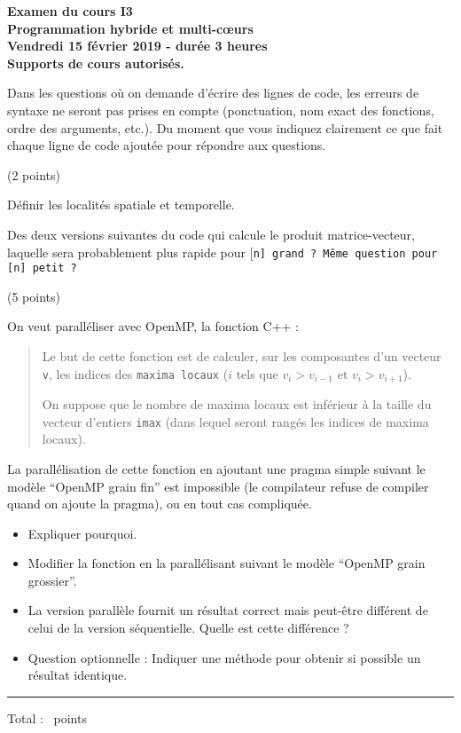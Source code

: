 \documentclass[12pt]{report}
\newcounter{cptPoints}
\newcounter{cptQuestions}
\newcommand\question[2]{\bigskip\par\addtocounter{cptQuestions}{1}\addtocounter{cptPoints}{#2}{\bf Question #1 n\textsuperscript{o} \thecptQuestions} (#2 points)\par}
\begin{document}
	\begin{center}\Large\bf
			Examen du cours I3\\
			Programmation hybride et multi-c\oe urs\\[0.4cm]
			Vendredi 15 f\'evrier 2019 - dur\'ee 3 heures\\
			Supports de cours autoris\'es.
		\end{center}
	\bigskip
	Dans les questions o\`u on demande d'\'ecrire des lignes de code, les erreurs de syntaxe ne seront pas prises en compte (ponctuation, nom exact des fonctions, ordre des arguments, etc.). Du moment que vous indiquez clairement ce que fait chaque ligne de code ajout\'ee pour r\'epondre aux questions.
		
	\bigskip
	
	\question{}2
	\medskip
	
	D\'efinir les localit\'es spatiale et temporelle.
	
	Des deux versions suivantes du code qui calcule le produit matrice-vecteur, laquelle sera probablement plus rapide pour [\tt n] grand ? M\^eme question pour [\tt n] petit ?
	
	
	
	
	\question{}5
	\medskip
	
	   On veut parall\'eliser avec OpenMP, la fonction C++ :
	
	
	\begin{quotation}\noindent%
		Le but de cette fonction est de calculer, sur les composantes d'un vecteur {\tt v}, les indices des {\tt maxima locaux} ($i$ tels que $v_i > v_{i-1}$ et $v_i > v_{i+1}$).
		
		\noindent%
		On suppose que le nombre de maxima locaux est inf\'erieur \`a la taille du vecteur d'entiers {\tt imax} (dans lequel seront rang\'es les indices de maxima locaux).
	\end{quotation}
	 
 La parall\'elisation de cette fonction en ajoutant une pragma simple suivant le mod\`ele ``OpenMP grain fin'' est impossible (le compilateur refuse de compiler quand on ajoute la pragma), ou en tout cas compliqu\'ee.
 
	 \begin{itemize}
	 	\item Expliquer pourquoi.
	 	\item Modifier la fonction en la parall\'elisant suivant le mod\`ele ``OpenMP grain grossier''.
	 	\item La version parall\`ele fournit un r\'esultat correct mais peut-\^etre diff\'erent de celui de la version s\'equentielle. Quelle est cette diff\'erence ?
	 	\item Question optionnelle : Indiquer une m\'ethode pour obtenir si possible un r\'esultat identique.
	 \end{itemize}
	 
         
\bigskip \rule{3cm}{.1pt}

Total : \thecptPoints \ points
 
\end{document}
